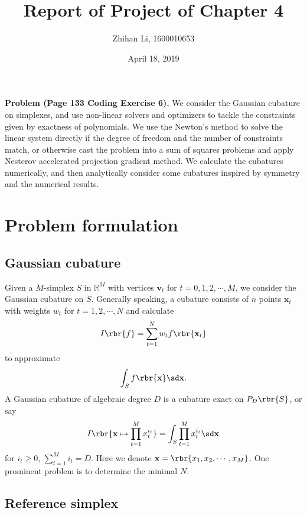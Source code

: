 \documentclass[english, nochinese]{pnote}
\title{Report of Project of Chapter 4}
\author{Zhihan Li, 1600010653}
\date{April 18, 2019}
\begin{document}
\maketitle

\textbf{Problem (Page 133 Coding Exercise 6).} We consider the Gaussian cubature on simplexes, and use non-linear solvers and optimizers to tackle the constraints given by exactness of polynomials. We use the Newton's method to solve the linear system directly if the degree of freedom and the number of constraints match, or otherwise cast the problem into a sum of squares problems and apply Nesterov accelerated projection gradient method. We calculate the cubatures numerically, and then analytically consider some cubatures inspired by symmetry and the numerical results.

\section{Problem formulation}

\subsection{Gaussian cubature}

Given a $M$-simplex $S$ in $\mathbb{R}^M$ with vertices $\mathbf{v}_t$ for $ t = 0, 1, 2, \cdots, M $, we consider the Gaussian cubature on $S$. Generally speaking, a cubature consists of $n$ points $\mathbf{x}_t$ with weights $w_t$ for $ t = 1, 2, \cdots, N $ and calculate
\begin{equation}
I \rbr{f} = \sum_{ t = 1 }^N w_t f \rbr{\mathbf{x}_t}
\end{equation}
to approximate
\begin{equation}
\int_S f \rbr{\mathbf{x}} \sd \mathbf{x}.
\end{equation}
A Gaussian cubature of algebraic degree $D$ is a cubature exact on $ P_D \rbr{S} $, or say
\begin{equation} \label{Eq:Cons}
I \rbr{ \mathbf{x} \mapsto \prod_{ t = 1 }^M x_t^{i_t} } = \int_S \prod_{ t = 1 }^M x_t^{i_t} \sd \mathbf{x}
\end{equation}
for $ i_t \ge 0 $, $ \sum_{ t = 1 }^M i_t = D $. Here we denote $ \mathbf{x} = \rbr{ x_1, x_2, \cdots, x_M } $. One prominent problem is to determine the minimal $N$.

\subsection{Reference simplex}
\end{document}
